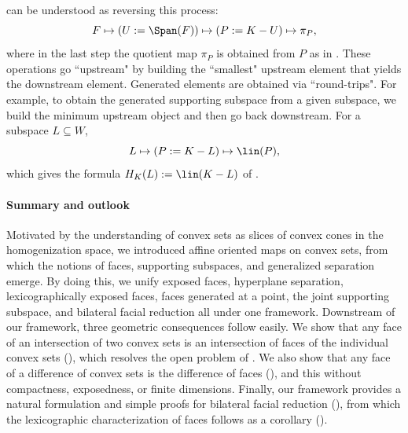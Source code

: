 \documentclass{article}
\theoremstyle{plain}
\theoremstyle{definition}
\theoremstyle{remark}
\begin{document}
 can be understood as reversing this process:
\begin{equation*}
F \mapsto (U := \Span(F)) \mapsto (P := K - U) \mapsto \pi_P,
\end{equation*}
where in the last step the quotient map $\pi_P$ is obtained from $P$ as
in .
These operations go ``upstream" by building the ``smallest" upstream element
that yields the downstream element. Generated elements are obtained
via ``round-trips". For example, to obtain the generated supporting subspace
from a given subspace, we build the minimum upstream object and then go back
downstream. For a subspace $L \subseteq W$,
\begin{equation*}
L \mapsto (P := K - L) \mapsto \lin(P),
\end{equation*}
which gives the formula $H_K(L) := \lin(K-L)$ of .

\paragraph{Summary and outlook}

\label{loc:body.conclusion.summary_and_outlook}
Motivated by the understanding of convex sets as slices of convex cones in the homogenization space, we introduced affine oriented maps on convex sets, from which the notions of faces, supporting subspaces, and generalized separation emerge. By doing this, we unify exposed faces, hyperplane separation, lexicographically exposed faces, faces generated at a point, the joint supporting subspace, and bilateral facial reduction all under one framework.
Downstream of our framework, three geometric consequences follow easily. We show that any face of an intersection of two convex sets is an intersection of faces of the individual convex sets (), which resolves the open problem of \cite{weisNoteFacesConvex2025}. We also show that any face of a difference of convex sets is the difference of faces (), and this without compactness, exposedness, or finite dimensions. Finally, our framework provides a natural formulation and simple proofs for bilateral facial reduction (), from which
the lexicographic characterization of faces follows as a corollary ().
\end{document}
